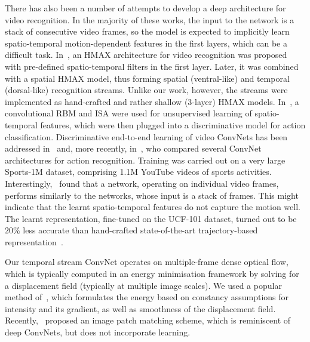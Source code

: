 \documentclass{article} \usepackage{nips14submit_e,times}
\begin{document}
There has also been a number of attempts to develop a deep architecture for video recognition. In the majority of these works, the input to the network is a stack of consecutive video
frames, so the model is expected to implicitly learn spatio-temporal motion-dependent features in the first layers, which can be a difficult task.
In~\cite{Jhuang07}, an HMAX architecture for video recognition was proposed with pre-defined spatio-temporal filters in the first layer.
Later, it was combined~\cite{Kuehne11} with a spatial HMAX model, thus forming spatial (ventral-like) and temporal (dorsal-like) recognition streams. 
Unlike our work, however, the streams were implemented as hand-crafted and rather shallow (3-layer) HMAX models.
In~\cite{Taylor10,Chen10,Le11}, a convolutional RBM and ISA were used for unsupervised learning of spatio-temporal features, which were then plugged into a discriminative model for action classification.
Discriminative end-to-end learning of video ConvNets has been addressed in~\cite{Ji13} and, more recently, in~\cite{Karpathy14}, who compared several ConvNet architectures for action recognition.
Training was carried out on a very large Sports-1M dataset, comprising 1.1M YouTube videos of sports activities.
Interestingly,~\cite{Karpathy14} found that a network, operating on individual video frames, performs similarly to the networks, whose input is a stack of frames.
This might indicate that the learnt spatio-temporal features do not capture the motion well.
The learnt representation, fine-tuned on the UCF-101 dataset, turned out to be $20\%$ less accurate than hand-crafted state-of-the-art trajectory-based representation~\cite{Wang13c,Peng14}. 


Our temporal stream ConvNet operates on multiple-frame dense optical flow, which
is typically computed in an energy minimisation framework by solving for a displacement field (typically at multiple image scales). 
We used a popular method of~\cite{Brox04}, which formulates the energy based on constancy assumptions for intensity and its gradient, as well as smoothness of the
displacement field. Recently,~\cite{Weinzaepfel13} proposed an image patch matching scheme, which is reminiscent of deep ConvNets, but does not incorporate learning.
\end{document}
